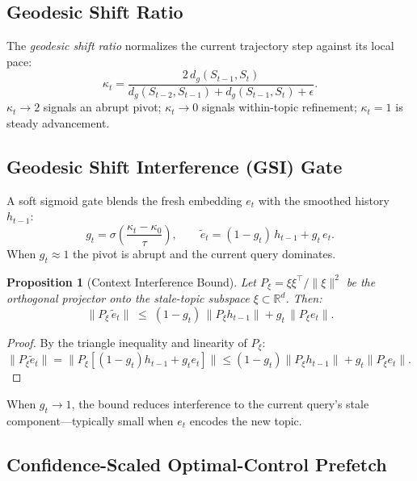 \documentclass[11pt,a4paper]{article}
\newtheorem{proposition}{Proposition}
\begin{document}
\subsection{Geodesic Shift Ratio}

The \emph{geodesic shift ratio} normalizes the current trajectory step against its local pace:
\begin{equation}
  \kappa_t = \frac{2\,d_g(S_{t-1},S_t)}{d_g(S_{t-2},S_{t-1}) + d_g(S_{t-1},S_t) + \epsilon}.
  \label{eq:gsr}
\end{equation}
$\kappa_t{\to}2$ signals an abrupt pivot; $\kappa_t{\to}0$ signals within-topic refinement; $\kappa_t{=}1$ is steady advancement.

\subsection{Geodesic Shift Interference (GSI) Gate}

A soft sigmoid gate blends the fresh embedding $e_t$ with the smoothed history $h_{t-1}$:
\begin{equation}
  g_t = \sigma\!\left(\frac{\kappa_t - \kappa_0}{\tau}\right), \qquad
  \tilde{e}_t = (1-g_t)\,h_{t-1} + g_t\,e_t.
  \label{eq:gate}
\end{equation}
When $g_t{\approx}1$ the pivot is abrupt and the current query dominates.

\begin{proposition}[Context Interference Bound]
\label{prop:interference_bound}
Let $P_\xi = \xi\xi^\top/\|\xi\|^2$ be the orthogonal projector onto the stale-topic subspace $\xi \subset \mathbb{R}^d$. Then:
\begin{equation}
  \|P_\xi\,\tilde{e}_t\| \;\leq\; (1-g_t)\,\|P_\xi h_{t-1}\| + g_t\,\|P_\xi e_t\|.
  \label{eq:bound}
\end{equation}
\end{proposition}
\begin{proof}
By the triangle inequality and linearity of $P_\xi$:
$\|P_\xi\tilde{e}_t\| = \|P_\xi[(1{-}g_t)h_{t-1}{+}g_t e_t]\| \leq (1{-}g_t)\|P_\xi h_{t-1}\| + g_t\|P_\xi e_t\|.$
\end{proof}

When $g_t{\to}1$, the bound reduces interference to the current query's stale component---typically small when $e_t$ encodes the new topic.

\subsection{Confidence-Scaled Optimal-Control Prefetch}
\end{document}
